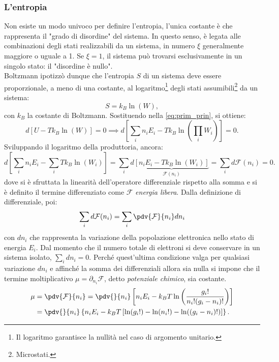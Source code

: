 \documentclass[a4paper,11pt]{report}
\begin{document}
\subsubsection{L'entropia}
Non esiste un modo univoco per definire l'entropia, l'unica costante è che rappresenta il "grado di disordine" del sistema. In questo senso, è legata alle combinazioni degli stati realizzabili da un sistema, in numero $\xi$ generalmente maggiore o uguale a 1. Se $\xi = 1$, il sistema può trovarsi esclusivamente in un singolo stato: il "disordine è nullo". \\

\noindent
Boltzmann ipotizzò dunque che l'entropia $S$ di un sistema deve essere proporzionale, a meno di una costante, al logaritmo\footnote{Il logaritmo garantisce la nullità nel caso di argomento unitario.} degli stati assumibili\footnote{Microstati.} da un sistema:
\begin{equation}
S = k_B \ln( W),
\end{equation}
 con $k_B$ la costante di Boltzmann. Sostituendo nella \eqref{eq:prim_prin}, si ottiene:
 \begin{equation}
d[U-Tk_B\ln( W)] = 0 \implies d{\left[ \sum_i n_i E_i  - Tk_B \ln\left( \prod_i W_i \right)\right]} = 0.
\end{equation}
Sviluppando il logaritmo della produttoria, ancora:
 \begin{equation}
d{\left[ \sum_i n_i E_i - \sum_iTk_B \ln (W_i)\right]} = \sum_id\underbrace{[n_iE_i- Tk_B\ln(W_i)]}_{\mathcal{F}(n_i)} = \sum_id\mathcal{F}(n_i) =  0.
\end{equation}
 dove si è sfruttata la linearità dell'operatore differenziale rispetto alla somma e si è definito il termine differenziato come $\mathcal{F}$ \textit{energia libera}. Dalla definizione di differenziale, poi: 
\begin{equation}
	\sum_id\mathcal{F}(n_i) = \sum_i \pdv{\mathcal{F}}{n_i} dn_i
\end{equation}
con $dn_i$ che rappresenta la variazione della popolazione elettronica nello stato di energia $E_i$. Dal momento che il numero totale di elettroni si deve conservare in un sistema isolato, $\sum_i dn_i = 0$. Perché quest'ultima condizione valga per qualsiasi variazione $dn_i$ e affinché la somma dei differenziali allora sia nulla si impone che il termine moltiplicativo $\mu = \partial_{n_i} \mathcal{F}$, detto \textit{potenziale chimico}, sia costante. 
\begin{equation}
\begin{aligned}
    \mu &= \pdv{\mathcal{F}}{n_i} = \pdv{}{n_i} \left[  n_i E_i - k_B T \ln\left( \frac{g_i!}{n_i!(g_i-n_i)!} \right)\right] \\
    &= \pdv{}{n_i} \left\{ n_i E_i- k_B T \left[ \ln(g_i!) - \ln(n_i!) - \ln((g_i-n_i)!) \right] \right\}.
\end{aligned}
\end{equation}
\end{document}
